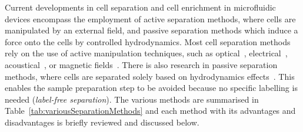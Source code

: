 Current developments in cell separation and cell enrichment in microfluidic devices encompass the employment of active separation methods, where cells are manipulated by an external field, and passive separation methods which induce a force onto the cells by controlled hydrodynamics. Most cell separation methods rely on the use of active manipulation techniques, such as optical~\cite{Ashkin1987,Grier2003}, electrical~\cite{Huang2001}, acoustical~\cite{Neild2007}, or magnetic fields~\cite{Helseth2003,Yellen2007,Erb2008}. There is also research in passive separation methods, where cells are separated solely based on hydrodynamics effects~\cite{Sajeesh2014}. This enables the sample preparation step to be avoided because no specific labelling is needed (\textit{label-free separation}). The various methods are summarised in Table~\ref{tab:variousSeparationMethods} and each method with its advantages and disadvantages is briefly reviewed and discussed below.

